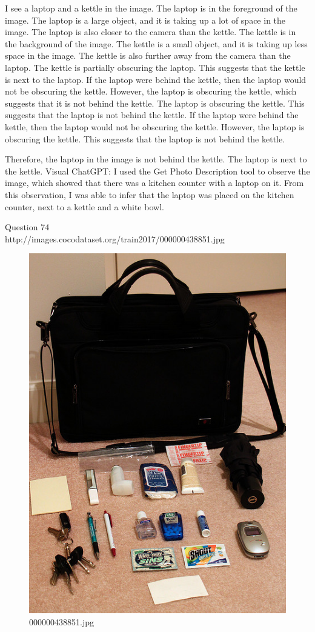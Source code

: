 \begin{enumerate}
    I see a laptop and a kettle in the image.
    The laptop is in the foreground of the image. The laptop is a large object, and it is taking up a lot of space in the image. The laptop is also closer to the camera than the kettle.
    The kettle is in the background of the image. The kettle is a small object, and it is taking up less space in the image. The kettle is also further away from the camera than the laptop.
    The kettle is partially obscuring the laptop. This suggests that the kettle is next to the laptop.
    If the laptop were behind the kettle, then the laptop would not be obscuring the kettle. However, the laptop is obscuring the kettle, which suggests that it is not behind the kettle.
    The laptop is obscuring the kettle. This suggests that the laptop is not behind the kettle. If the laptop were behind the kettle, then the laptop would not be obscuring the kettle. However, the laptop is obscuring the kettle. This suggests that the laptop is not behind the kettle.
    
    Therefore, the laptop in the image is not behind the kettle. The laptop is next to the kettle.
    \subitem Visual ChatGPT: I used the Get Photo Description tool to observe the image, which showed that there was a kitchen counter with a laptop on it. From this observation, I was able to infer that the laptop was placed on the kitchen counter, next to a kettle and a white bowl.
\end{enumerate}
Question 74\\
http://images.cocodataset.org/train2017/000000438851.jpg
\begin{figure}[h]
    \centering
    \includegraphics[width=0.8\linewidth]{../image set/hard/000000438851.jpg}
    \caption{000000438851.jpg}
\end{figure}
